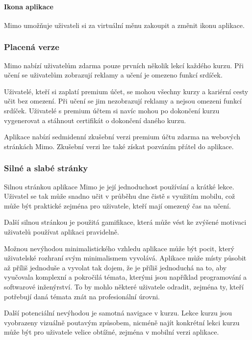 \paragraph{Ikona aplikace} Mimo umožňuje uživateli si za virtuální měnu zakoupit a změnit ikonu aplikace.

\subsubsection{Placená verze}

Mimo nabízí uživatelům zdarma pouze prvních několik lekcí každého kurzu. Při učení se uživatelům zobrazují reklamy a učení je omezeno funkcí srdíček.

Uživatelé, kteří si zaplatí premium účet, se mohou všechny kurzy a kariérní cesty učit bez omezení. Při učení se jim nezobrazují reklamy a nejsou omezeni funkcí srdíček. Uživatelé s premium účtem si navíc mohou po dokončení kurzu vygenerovat a stáhnout certifikát o dokončení daného kurzu. 

Aplikace nabízí sedmidenní zkušební verzi premium účtu zdarma na webových stránkách Mimo. Zkušební verzi lze také získat pozváním přátel do aplikace.

\subsubsection{Silné a slabé stránky}

Silnou stránkou aplikace Mimo je její jednoduchost používání a krátké lekce. Uživatel se tak může snadno učit v průběhu dne čistě s využitím mobilu, což může být praktické zejména pro uživatele, kteří mají omezený čas na učení.

Další silnou stránkou je použitá gamifikace, která může vést ke zvýšené motivaci uživatelů používat aplikaci pravidelně.

Možnou nevýhodou minimalistického vzhledu aplikace může být pocit, který uživatelské rozhraní svým minimalismem vyvolává. Aplikace může místy působit až příliš jednoduše a vyvolat tak dojem, že je příliš jednoduchá na to, aby vyučovala komplexní a pokročilá témata, kterými jsou například programování a softwarové inženýrství. To by mohlo některé uživatele odradit, zejména ty, kteří potřebují daná témata znát na profesionální úrovni.

Další potenciální nevýhodou je samotná navigace v kurzu. Lekce kurzu jsou vyobrazeny vizuálně poutavým způsobem, nicméně najít konkrétní lekci kurzu může být pro uživatele velice obtížné, zejména v mobilní verzi aplikace.

